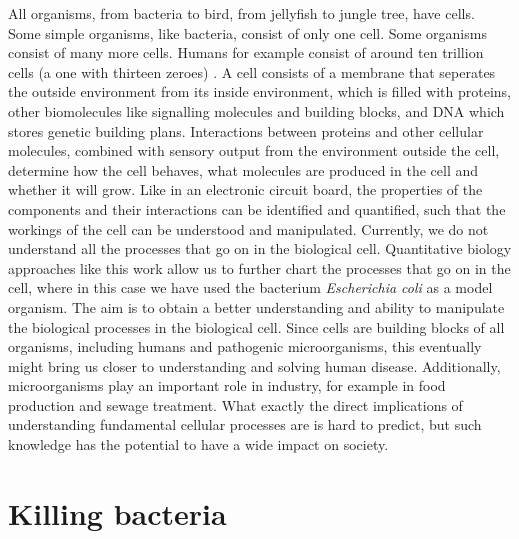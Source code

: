All organisms, from bacteria to bird, from jellyfish to jungle tree, have cells. 
%
Some simple organisms, like bacteria, consist of only one cell.
Some organisms consist of many more cells.
Humans for example consist of around ten trillion cells (a one with thirteen zeroes) \cite[BNID 102390]{Milo2010}.
%
A cell consists of a membrane that %
seperates the outside environment from its inside environment, 
which is filled with proteins, other biomolecules like signalling molecules and building blocks, and DNA which stores genetic building plans.
%
Interactions between proteins and other cellular molecules, combined with sensory output from the environment outside the cell, 
determine how the cell behaves, what molecules are produced in the cell and whether it will grow.
%
Like 
in an electronic circuit board,
the properties of the components and their interactions can be identified and quantified,
such that the workings of the cell can be understood and manipulated.
%
Currently, we do not understand all the processes that go on in the biological cell.
%
Quantitative biology approaches like this work allow us to further chart the processes that go on in the cell,
where in this case we have used the bacterium \textit{Escherichia coli} as a model organism. 
%
The aim is to obtain a better understanding and ability to manipulate the biological processes in the biological cell. 
%
Since cells are building blocks of all organisms, 
including humans and pathogenic microorganisms,
this eventually might bring us closer to understanding and solving human disease.
%
Additionally, microorganisms play an important role in industry,
for example in food production and sewage treatment.
%
What exactly the direct implications of understanding fundamental cellular processes are is hard to predict,
but such knowledge has the potential to have a wide impact on society.

\section{Killing bacteria}

